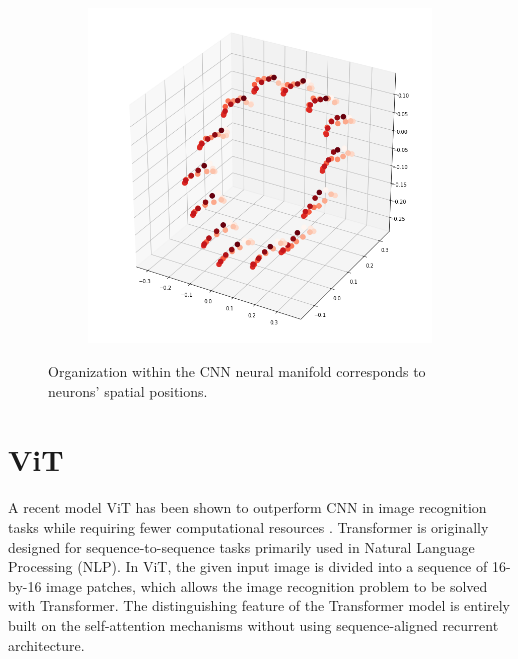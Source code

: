 \begin{figure}[H]
\begin{subfigure}[b]{0.3\textwidth}
\end{subfigure}
\hfill
\begin{subfigure}[b]{0.3\textwidth}
    \includegraphics[width=\textwidth]{figures/embeddings/vit-spatial2.png}
\end{subfigure}
\caption{Organization within the CNN neural manifold corresponds to neurons' spatial positions.}
\end{figure}


\section{ViT}

A recent model ViT has been shown to outperform CNN in image recognition tasks while requiring fewer computational resources \cite{vit-vs-cnn}. Transformer \cite{vaswani_attention_2017} is originally designed for sequence-to-sequence tasks primarily used in Natural Language Processing (NLP). In ViT, the given input image is divided into a sequence of 16-by-16 image patches, which allows the image recognition problem to be solved with Transformer. The distinguishing feature of the Transformer model is entirely built on the self-attention mechanisms without using sequence-aligned recurrent architecture.


